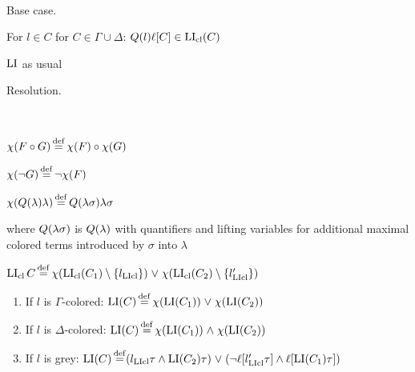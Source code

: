\documentclass[,%
	draft=false,%
	numbers=noendperiod
	11pt,
	a4paper,
	oneside,%
	openany,
]{memoir}
\begin{document}
\begin{defi}[$\LI$]
	~

	\begin{description}
		\item{} Base case.

			For $l \in C$ for $C \in \Gamma\cup\Delta$:
			$Q(l) \ell[C] \in \operatorname{LI}_{\operatorname{cl}}(C)$

			$\LI$ as usual

		\item{} Resolution.

			\begin{defi}~

				$\chi(F \circ G) \operatorname{\stackrel{\mathrm{def}}{=}} \chi(F) \circ \chi(G)$

				$\chi(\lnot G) \operatorname{\stackrel{\mathrm{def}}{=}} \lnot \chi(F) $

				$\chi(Q(\lambda)\lambda) \operatorname{\stackrel{\mathrm{def}}{=}} Q(\lambda\sigma) \lambda\sigma$

				where $Q(\lambda\sigma)$ is $Q(\lambda)$ with quantifiers and lifting variables for additional maximal colored terms introduced by $\sigma$ into $\lambda$
			\end{defi}

			$\operatorname{LI}_{\operatorname{cl}}{C} \operatorname{\stackrel{\mathrm{def}}{=}}
			\chi(\operatorname{LI}_{\operatorname{cl}}(C_1) \setminus \{l_{\operatorname{LIcl}}\})
			\;{\lor}\;
			\chi(\operatorname{LI}_{\operatorname{cl}}(C_2) \setminus \{l'_{\operatorname{LIcl}}\})
			$





			\begin{enumerate}

				\item If $l$ is $\Gamma$-colored:
					$\operatorname{LI}(C) \operatorname{\stackrel{\mathrm{def}}{=}} \chi(\operatorname{LI}(C_1))\;{\lor}\; \chi(\operatorname{LI}(C_2)) $

				\item If $l$ is $\Delta$-colored:
					$\operatorname{LI}(C) \operatorname{\stackrel{\mathrm{def}}{=}} \chi(\operatorname{LI}(C_1))\;{\land}\; \chi(\operatorname{LI}(C_2)) $

				\item If $l$ is grey:
					$\operatorname{LI}(C) \operatorname{\stackrel{\mathrm{def}}{=}}
					({l_{\operatorname{LIcl}}\tau} \land {\operatorname{LI}(C_2)\tau}) \;{\lor}\;
					(\lnot \ell[l'_{\operatorname{LIcl}}\tau]\land \ell[\operatorname{LI}(C_1)\tau ])
					$

			\end{enumerate}



	\end{description}
\end{defi}
\end{document}
